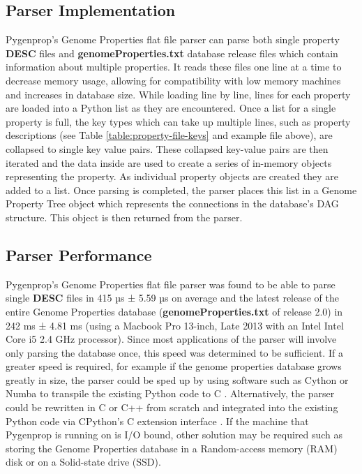 \subsection{Parser Implementation}

Pygenprop's Genome Properties flat file parser can parse both single property \textbf{DESC} files and \textbf{genomeProperties.txt} database release files which contain information about multiple properties. It reads these files one line at a time to decrease memory usage, allowing for compatibility with low memory machines and increases in database size. While loading line by line, lines for each property are loaded into a Python list as they are encountered. Once a list for a single property is full, the key types which can take up multiple lines, such as property descriptions (see Table \ref{table:property-file-keys} and example file above), are collapsed to single key value pairs. These collapsed key-value pairs are then iterated and the data inside are used to create a series of in-memory objects representing the property. As individual property objects are created they are added to a list. Once parsing is completed, the parser places this list in a Genome Property Tree object which represents the connections in the database's DAG structure. This object is then returned from the parser.

\subsection{Parser Performance}

Pygenprop's Genome Properties flat file parser was found to be able to parse single \textbf{DESC} files in 415 µs ± 5.59 µs on average and the latest release of the entire Genome Properties database (\textbf{genomeProperties.txt} of release 2.0) in 242 ms ± 4.81 ms (using a Macbook Pro 13-inch, Late 2013 with an Intel Intel Core i5 2.4 GHz processor). Since most applications of the parser will involve only parsing the database once, this speed was determined to be sufficient. If a greater speed is required, for example if the genome properties database grows greatly in size, the parser could be sped up by using software such as Cython \cite{behnel2010cython} or Numba \cite{lam2015numba} to transpile the existing Python code to C \cite{kernighan2006c}. Alternatively, the parser could be rewritten in C or C++ \cite{ISO:1998:IIP} from scratch and integrated into the existing Python code via CPython's C extension interface \cite{van1995python}. If the machine that Pygenprop is running on is I/O bound, other solution may be required such as storing the Genome Properties database in a Random-access memory (RAM) disk or on a Solid-state drive (SSD). \\

